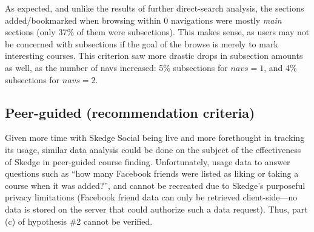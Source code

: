   As expected, and unlike the results of further direct-search analysis, the sections added/bookmarked when browsing within 0 navigations were mostly \emph{main} sections (only 37\% of them were subsections). This makes sense, as users may not be concerned with subsections if the goal of the browse is merely to mark interesting courses. This criterion saw more drastic drops in subsection amounts as well, as the number of navs increased: 5\% subsections for ${navs}=1$, and 4\% subsections for ${navs}=2$.

\subsection{Peer-guided (recommendation criteria)}

  Given more time with Skedge Social being live and more forethought in tracking its usage, similar data analysis could be done on the subject of the effectiveness of Skedge in peer-guided course finding. Unfortunately, usage data to answer questions such as ``how many Facebook friends were listed as liking or taking a course when it was added?'', and cannot be recreated due to Skedge's purposeful privacy limitations (Facebook friend data can only be retrieved client-side---no data is stored on the server that could authorize such a data request). Thus, part (c) of hypothesis \#2 cannot be verified.
